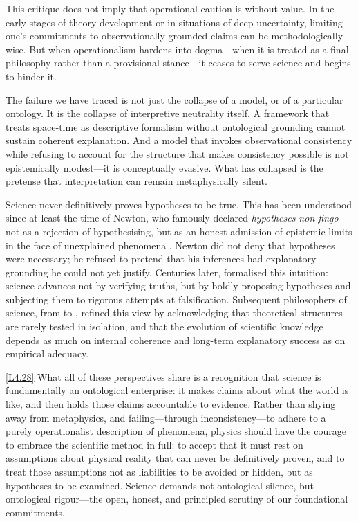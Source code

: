 \documentclass[12pt]{book}
\newcounter{logicanchor}
\newenvironment{logicanchorenv}[1]{\refstepcounter{logicanchor}\label{#1}}{}
\newcommand{\logiclink}[2]{\begin{logicanchorenv}{logic:#1}\end{logicanchorenv}\hyperref[appendix:#1]{[#1]}\xspace}
\begin{document}
This critique does not imply that operational caution is without value. In the early stages of theory development or in situations of deep uncertainty, limiting one's commitments to observationally grounded claims can be methodologically wise. But when operationalism hardens into dogma---when it is treated as a final philosophy rather than a provisional stance---it ceases to serve science and begins to hinder it.

The failure we have traced is not just the collapse of a model, or of a particular ontology. It is the collapse of interpretive neutrality itself. A framework that treats space-time as descriptive formalism without ontological grounding cannot sustain coherent explanation. And a model that invokes observational consistency while refusing to account for the structure that makes consistency possible is not epistemically modest---it is conceptually evasive. What has collapsed is the pretense that interpretation can remain metaphysically silent.

Science never definitively proves hypotheses to be true. This has been understood since at least the time of Newton, who famously declared \textit{hypotheses non fingo}---not as a rejection of hypothesising, but as an honest admission of epistemic limits in the face of unexplained phenomena \citep{newton1713}. Newton did not deny that hypotheses were necessary; he refused to pretend that his inferences had explanatory grounding he could not yet justify. Centuries later, \citet{popper2005} formalised this intuition: science advances not by verifying truths, but by boldly proposing hypotheses and subjecting them to rigorous attempts at falsification. Subsequent philosophers of science, from \citet{quine1951} to \citet{lakatos1970}, refined this view by acknowledging that theoretical structures are rarely tested in isolation, and that the evolution of scientific knowledge depends as much on internal coherence and long-term explanatory success as on empirical adequacy.

\logiclink{L4.28}{} What all of these perspectives share is a recognition that science is fundamentally an ontological enterprise: it makes claims about what the world is like, and then holds those claims accountable to evidence. Rather than shying away from metaphysics, and failing---through inconsistency---to adhere to a purely operationalist description of phenomena, physics should have the courage to embrace the scientific method in full: to accept that it must rest on assumptions about physical reality that can never be definitively proven, and to treat those assumptions not as liabilities to be avoided or hidden, but as hypotheses to be examined. Science demands not ontological silence, but ontological rigour---the open, honest, and principled scrutiny of our foundational commitments.
\end{document}
